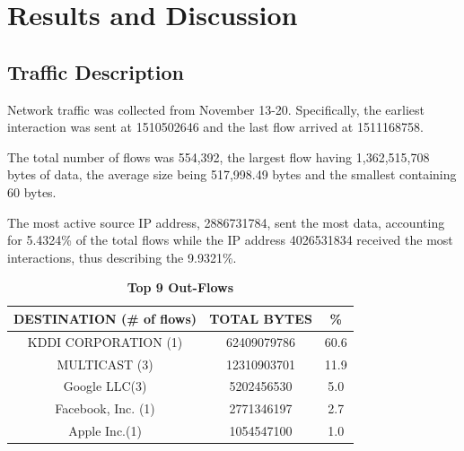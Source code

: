\documentclass[journal]{IEEE/IEEEtran}
\begin{document}
\section{Results and Discussion}

\subsection{Traffic Description}

Network traffic was collected from November 13-20. Specifically, the earliest interaction was sent at 1510502646 and the last flow arrived at 1511168758.

The total number of flows was 554,392, the largest flow having 1,362,515,708 bytes of data, the average size being 517,998.49 bytes and the smallest containing 60 bytes.

The most active source IP address, 2886731784, sent  the most data, accounting for 5.4324\% of the total flows while the IP address 4026531834 received the most interactions, thus describing the 9.9321\%.

\begin{table}[ht]
\centering
\caption{\textbf{Top 9 Out-Flows}}
\label{top-out-flows}
\begin{tabular}{|c|c|c|}
\hline
\textbf{DESTINATION (\# of flows)} 		& \textbf{TOTAL BYTES} 	& \textbf{\%} \\ \hline
	KDDI CORPORATION (1)				&  62409079786			& 60.6        \\ \hline
	MULTICAST (3)						&  12310903701          & 11.9        \\ \hline
	Google LLC(3)						&  5202456530           & 5.0         \\ \hline
	Facebook, Inc. (1)					&  2771346197           & 2.7         \\ \hline
	Apple Inc.(1)						&  1054547100           & 1.0         \\ \hline
\end{tabular}
\end{table}
\end{document}
